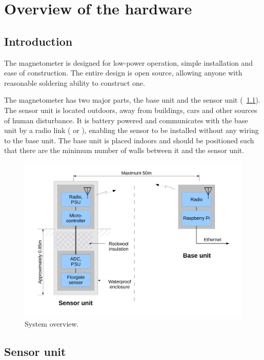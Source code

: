 \chapter{Overview of the hardware}

\section{Introduction}
The magnetometer is designed for low-power operation, simple
installation and ease of construction. The entire design is open
source, allowing anyone with reasonable soldering ability to construct
one.

The magnetometer has two major parts, the base unit and the sensor
unit (\figurename~\ref{fig:system-overview}). The sensor unit is located
outdoors, away from buildings, cars and other sources of human
disturbance. It is battery powered and communicates with the base unit
by a radio link ( or ), enabling the sensor to be
installed without any wiring to the base unit. The base unit is placed
indoors and should be positioned such that there are the minimum
number of walls between it and the sensor unit.

\begin{figure}
  \centering
  \includegraphics[keepaspectratio,width=\textwidth]{images/system-overview}
  \caption[System overview]%
  {System overview.}
  \label{fig:system-overview}
\end{figure}

\section{Sensor unit}

